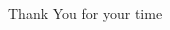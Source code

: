 \STANDARD{}
{
  \begin{columns}
    \begin{column}{0.35\textwidth}
      \begin{block}{~~~~~~Thank You}
        \centering
        for your time
      \end{block}
    \end{column}
  \end{columns}
}


